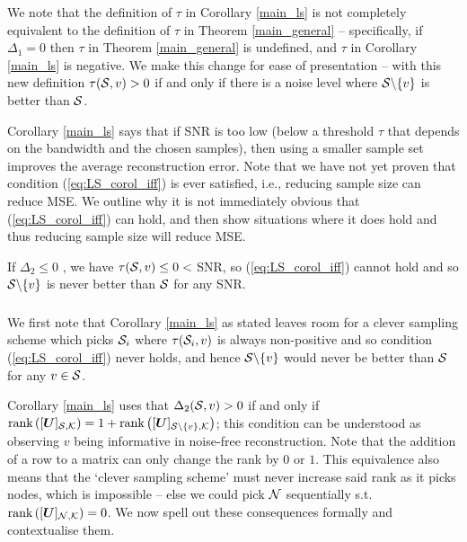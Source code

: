 {\color{black} We note that the definition of $\tau$ in Corollary \ref{main_ls} is not completely equivalent to the definition of $\tau$ in Theorem \ref{main_general} -- specifically, if $\Delta_{1} = 0$ then $\tau$ in Theorem \ref{main_general} is undefined, and $\tau$ in Corollary \ref{main_ls} is negative. We make this change for ease of presentation -- with this new definition $\tau(\mathcal{S},v) > 0$ if and only if there is a noise level where $\mathcal{S} \backslash \{v\}$ is better than $\mathcal{S}$. }

Corollary \ref{main_ls} says that if SNR is too low (below a threshold $\tau$ that depends on the bandwidth and the chosen samples), then using a smaller sample set improves the average reconstruction error. Note that we have not yet proven that condition (\ref{eq:LS_corol_iff}) is ever satisfied, i.e., reducing sample size can reduce MSE. We outline why it is not immediately obvious that (\ref{eq:LS_corol_iff}) can hold, and then show situations where it does hold and thus reducing sample size will reduce MSE.

\begin{remark}
    If $\Delta_{2} \leq 0$ , we have $\tau(\mathcal{S},v) \leq 0 < $ SNR, so (\ref{eq:LS_corol_iff}) cannot hold and so $\mathcal{S} \backslash \{v\}$ is never better than $\mathcal{S}$ for any SNR.
\end{remark}

\subsubsection{}
We first note that Corollary \ref{main_ls} {\color{black} as stated} leaves room for a clever sampling scheme which picks $\mathcal{S}_{i}$ where $\tau(\mathcal{S}_{i},v)$ is always non-positive and so condition (\ref{eq:LS_corol_iff}) never holds, and hence $\mathcal{S} \backslash \{v\}$ would never be better than $\mathcal{S}$ for any $v \in \mathcal{S}$. 

{\color{black} Corollary \ref{main_ls} uses that $\Delta_{2}(\mathcal{S},v) > 0$ if and only if $ \textrm{rank}\left([\bm{U}]_{\mathcal{S}, \mathcal{K}}\right) = 1 + \textrm{rank}\left([\bm{U}]_{\mathcal{S} \backslash \{v\}, \mathcal{K}}\right)$; this condition can be understood as observing $v$ being informative in noise-free reconstruction. Note that the addition of a row to a matrix can only change the rank by $0$ or $1$. This equivalence also means that the `clever sampling scheme' must never increase said rank as it picks nodes, which is impossible -- else we could pick $\mathcal{N}$ sequentially s.t. $\rank{\matrsubU{N}} = 0$. We now spell out these consequences formally and contextualise them. }


